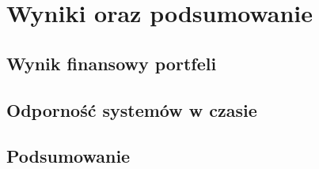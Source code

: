 \chapter{Wyniki oraz podsumowanie}
\label{chap:wyniki-oraz-podsumowanie}
\section{Wynik finansowy portfeli}
\section{Odporność systemów w czasie}
\section{Podsumowanie}
